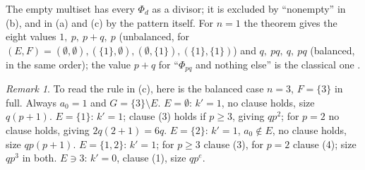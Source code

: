 \documentclass[11pt,a4paper]{amsart}
\theoremstyle{definition}
\theoremstyle{remark}
\newtheorem{remark}[theorem]{Remark}
\begin{document}
The empty multiset has every $\Phi_d$ as a divisor; it is excluded by ``nonempty'' in (b), and in (a) and
(c) by the pattern itself. For $n=1$ the theorem gives the eight values
$1,\ p,\ p+q,\ p$ (unbalanced, for $(E,F)=(\emptyset,\emptyset),(\{1\},\emptyset),(\emptyset,\{1\}),(\{1\},\{1\})$)
and $q,\ pq,\ q,\ pq$ (balanced, in the same order); the value $p+q$ for ``$\Phi_{pq}$ and nothing
else'' is the classical one \cite{LL}. 
\begin{remark}\label{rem:example}
To read the rule in (c), here is the balanced case $n=3$, $F=\{3\}$ in full. Always $a_0=1$ and $G=\{3\}\setminus E$.
$E=\emptyset$: $k'=1$, no clause holds, size $q(p+1)$. $E=\{1\}$: $k'=1$; clause (3) holds if $p\ge 3$, giving
$qp^2$; for $p=2$ no clause holds, giving $2q(2+1)=6q$. $E=\{2\}$: $k'=1$, $a_0\notin E$, no clause holds,
size $qp(p+1)$. $E=\{1,2\}$: $k'=1$; for $p\ge3$ clause (3), for $p=2$ clause (4); size $qp^3$ in both.
$E\ni 3$: $k'=0$, clause (1), size $qp^{e}$.
\end{remark}
\end{document}
